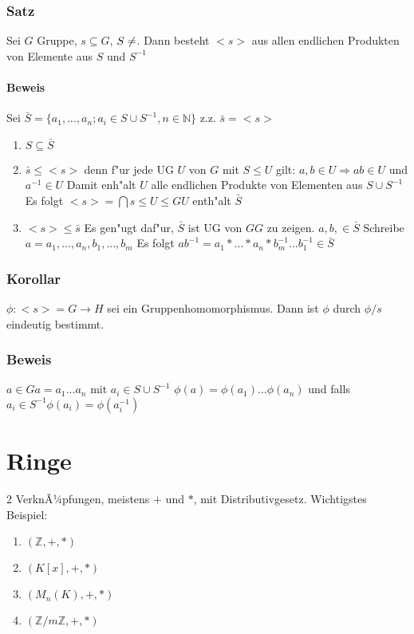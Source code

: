 \documentclass[12pt,a4paper,ngerman]{scrreprt}
\begin{document}
\subsection{Satz}
Sei $G$ Gruppe, $s \subseteq G$, $S \neq \empty$. 
Dann besteht $<s>$ aus allen endlichen Produkten von Elemente aus $S$ und $S^{-1}$ %

\subsubsection{Beweis}
Sei $\bar{S} = \{a_1, ..., a_n ; a_i \in S \cup S^{-1}, n \in \mathbb{N} \}$
z.z. $\bar{s} = <s>$
\begin{enumerate}[]
\item $S \subseteq \bar{S}$
\item $\bar{s} \leq <s>$ denn f"ur jede UG $U$ von $G$ mit $S \leq U$ gilt:
$a,b \in U \Rightarrow ab \in U$ und $a^{-1} \in U$
Damit enh"alt $U$ alle endlichen Produkte von Elementen aus $S \cup S^{-1}$
Es folgt $<s> = \bigcap{s \leq U \leq G}{U}$ enth"alt $\bar{S}$
\item $<s> \leq \bar{s}$ Es gen"ugt daf"ur, $\bar{S}$ ist UG von $GG$ zu zeigen. 
$a,b, \in \bar{S}$
Schreibe $a= a_1, ..., a_n, b_1, ... , b_m$
Es folgt $ab^{-1} = a_1* ... * a_n* b_m^{-1} ... b_1^{-1} \in \bar{S}$
\end{enumerate}

\subsection{Korollar}
$\phi : <s> = G \to H$ sei ein Gruppenhomomorphismus. 
Dann ist $\phi$ durch $\phi/s$ eindeutig bestimmt.

\subsection{Beweis}
$a \in G a=a_1 ... a_n $ mit $a_i \in S \cup S^{-1}$
$\phi(a) = \phi(a_1) ... \phi(a_n) $ und falls $a_i \in S^{-1} \phi(a_i) = \phi(a_i^{-1})$



\chapter{Ringe}

2 VerknÃ¼pfungen, meistens $+$ und $*$, mit Distributivgesetz. Wichtigstes Beispiel:
\begin{enumerate}[]
\item $(\mathbb{Z},+,*)$
\item $(K[x],+,*)$
\item $(M_n(K),+,*)$
\item $(\mathbb{Z}/m\mathbb{Z},+,*)$
\end{enumerate}
\end{document}
